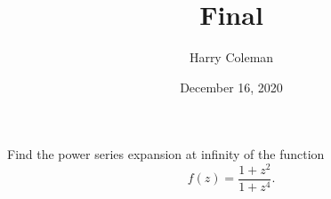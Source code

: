 \documentclass[12pt]{article}
\newenvironment{problem}
    {\begin{lrbox}{\mybox}\begin{minipage}{0.98\textwidth}}
    {\end{minipage}\end{lrbox}\framebox[\textwidth]{\usebox{\mybox}}}
\begin{document}
 
\title{Final\\
}
\author{Harry Coleman}
\date{December 16, 2020}
\maketitle

\section{}
\begin{problem}
    Find the power series expansion at infinity of the function
    \[
        f(z) = \frac{1 + z^2}{1 + z^4}.
    \]
\end{problem}
\medskip
\end{document}
